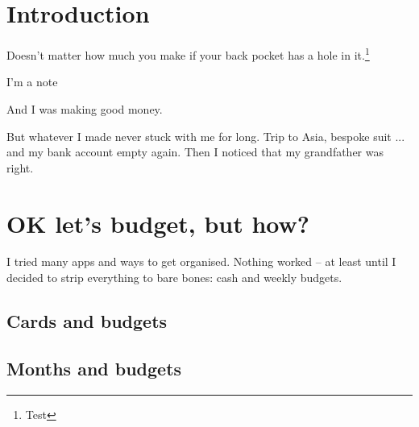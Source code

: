 \begin{figure}
  \centering
\end{figure}
  
\section*{Introduction}

Doesn't matter how much you make if your back pocket has a hole in it.\footnote{Test}

\begin{note}
I'm a note
\end{note}



And I was making good money.

But whatever I made never stuck with me for long. Trip to Asia, bespoke suit ... and my bank account empty again. Then I noticed that my grandfather was right.

\section{OK let's budget, but how?}

I tried many apps and ways to get organised. Nothing worked – at least until I decided to strip everything to bare bones: cash and weekly budgets.

\subsection{Cards and budgets}
\subsection{Months and budgets}

